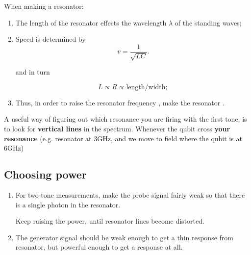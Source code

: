 \begin{framed}\noindent
  When making a resonator:
  \begin{enumerate}
  \item The length of the  resonator effects the wavelength $\lambda$
    of the standing waves;

  \item Speed is determined by
    \begin{equation}
      \label{eq:resonator2}
      v = \frac{1}{\sqrt{LC}}.
    \end{equation}

    \noindent and in turn

    \begin{equation}
      \label{eq:resonator3}
      L      \propto  R \propto  \text{length}/\text{width};
    \end{equation}

  \item   Thus,   in  order   to   raise   the  resonator   frequency
    , make the resonator .
  \end{enumerate}
\end{framed}

\noindent A useful way of figuring out which resonance you are firing
with the  first tone, is to  look for \textbf{vertical lines}  in the
spectrum.   Whenever the  qubit cross  \textbf{your resonance}  (e.g.
resonator at 3GHz, and  we move to field where the  qubit is at 6GHz)

\subsection{Choosing power}
\label{sec:choosing-power}

\begin{enumerate}
\item For two-tone measurements, make the probe signal 
  fairly weak so that there is a single photon in the resonator.

  Keep raising the power, until resonator lines become distorted.

\item The  generator signal  should be weak  enough to
  get a  thin response from resonator,  but powerful enough to  get a
  response at all.
\end{enumerate}

\newpage
